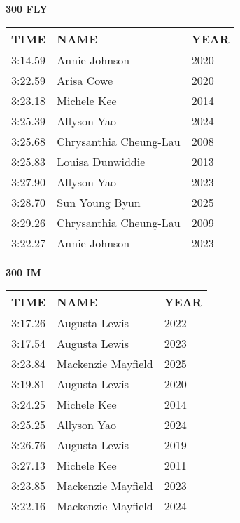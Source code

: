 \begin{table}[H]
\centering
\begin{minipage}[t]{0.48\textwidth}
\centering
\textbf{300 FLY}\\[0.1cm]
\begin{tabular}{@{}p{1.8cm}p{2.8cm}p{1.2cm}@{}}
\hline
    \textbf{TIME} & \textbf{NAME} & \textbf{YEAR} \\
\hline
    3:14.59 & Annie Johnson & 2020 \\
    3:22.59 & Arisa Cowe & 2020 \\
    3:23.18 & Michele Kee & 2014 \\
    3:25.39 & Allyson Yao & 2024 \\
    3:25.68 & Chrysanthia Cheung-Lau & 2008 \\
    3:25.83 & Louisa Dunwiddie & 2013 \\
    3:27.90 & Allyson Yao & 2023 \\
    3:28.70 & Sun Young Byun & 2025 \\
    3:29.26 & Chrysanthia Cheung-Lau & 2009 \\
    3:22.27 & Annie Johnson & 2023 \\
\hline
\end{tabular}
\end{minipage}\hfill
\begin{minipage}[t]{0.48\textwidth}
\centering
\textbf{300 IM}\\[0.1cm]
\begin{tabular}{@{}p{1.8cm}p{2.8cm}p{1.2cm}@{}}
\hline
    \textbf{TIME} & \textbf{NAME} & \textbf{YEAR} \\
\hline
    3:17.26 & Augusta Lewis & 2022 \\
    3:17.54 & Augusta Lewis & 2023 \\
    3:23.84 & Mackenzie Mayfield & 2025 \\
    3:19.81 & Augusta Lewis & 2020 \\
    3:24.25 & Michele Kee & 2014 \\
    3:25.25 & Allyson Yao & 2024 \\
    3:26.76 & Augusta Lewis & 2019 \\
    3:27.13 & Michele Kee & 2011 \\
    3:23.85 & Mackenzie Mayfield & 2023 \\
    3:22.16 & Mackenzie Mayfield & 2024 \\
\hline
\end{tabular}
\end{minipage}
\end{table}

